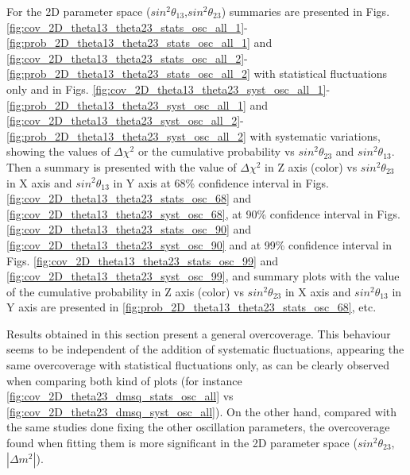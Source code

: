 For the 2D parameter space ($sin^{2}\theta_{13}$,$sin^{2}\theta_{23}$) summaries are presented in Figs. 
\ref{fig:cov_2D_theta13_theta23_stats_osc_all_1}-\ref{fig:prob_2D_theta13_theta23_stats_osc_all_1} and \ref{fig:cov_2D_theta13_theta23_stats_osc_all_2}-\ref{fig:prob_2D_theta13_theta23_stats_osc_all_2} with statistical fluctuations only and in Figs. \ref{fig:cov_2D_theta13_theta23_syst_osc_all_1}-\ref{fig:prob_2D_theta13_theta23_syst_osc_all_1} and \ref{fig:cov_2D_theta13_theta23_syst_osc_all_2}-\ref{fig:prob_2D_theta13_theta23_syst_osc_all_2} with systematic variations, showing the values of $\Delta\chi^{2}$ or the cumulative probability vs $sin^{2}\theta_{23}$ and $sin^{2}\theta_{13}$. 
Then a summary is presented with the value of $\Delta\chi^{2}$ in Z axis (color) vs $sin^{2}\theta_{23}$ in X axis and $sin^{2}\theta_{13}$ in Y axis at 68\% confidence interval in Figs.\ref{fig:cov_2D_theta13_theta23_stats_osc_68} and \ref{fig:cov_2D_theta13_theta23_syst_osc_68}, at 90\% confidence interval in Figs. \ref{fig:cov_2D_theta13_theta23_stats_osc_90} and \ref{fig:cov_2D_theta13_theta23_syst_osc_90} and at 99\%  confidence interval in Figs. \ref{fig:cov_2D_theta13_theta23_stats_osc_99} and \ref{fig:cov_2D_theta13_theta23_syst_osc_99},
and summary plots with the value of the cumulative probability in Z axis (color) vs $sin^{2}\theta_{23}$ in X axis and $sin^{2}\theta_{13}$ in Y axis are presented in \ref{fig:prob_2D_theta13_theta23_stats_osc_68}, etc. 

Results obtained in this section present a general overcoverage. 
This behaviour seems to be independent of the addition of systematic fluctuations, appearing the same overcoverage with statistical fluctuations only, as can be clearly observed when comparing both kind of plots (for instance \ref{fig:cov_2D_theta23_dmsq_stats_osc_all} vs \ref{fig:cov_2D_theta23_dmsq_syst_osc_all}).
On the other hand, compared with the same studies done fixing the other oscillation parameters, the overcoverage found when fitting them is more significant in the 2D parameter space ($sin^{2}\theta_{23}$,$|\Delta m^{2}|$). 

